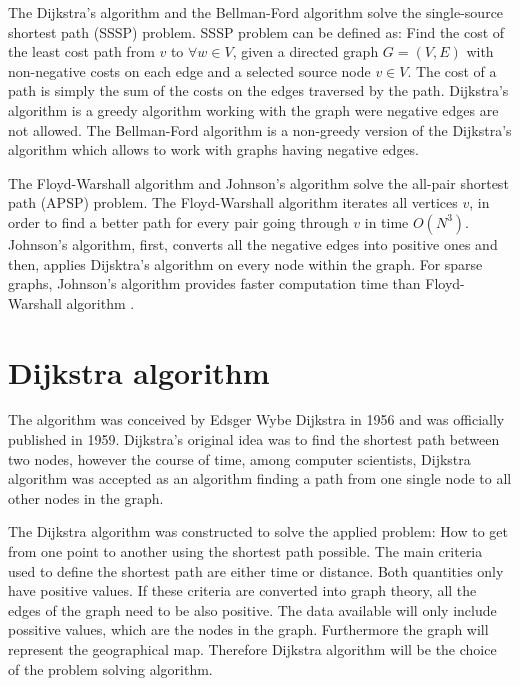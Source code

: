\documentclass[thesis=M,english]{FITthesis}[2012/10/20]
\begin{document}
The Dijkstra's algorithm \cite{Dijkstra59} and the Bellman-Ford algorithm \cite{Bellman58, FordFulkerson62} solve the single-source shortest path (SSSP) problem. SSSP problem can be defined as: Find the cost of the least cost path from $v$ to $\forall w \in V$, given a directed graph $G = (V,E)$ with non-negative costs on each edge and a selected source node $v \in V$. The cost of a path is simply the sum of the costs on the edges traversed by the path. Dijkstra's algorithm is a greedy algorithm working with the graph were negative edges are not allowed. The Bellman-Ford algorithm is a non-greedy version of the Dijkstra's algorithm which allows to work with graphs having negative edges.

The Floyd-Warshall algorithm \cite{Warshall62, Floyd56} and Johnson's algorithm \cite{Johnson77} solve the all-pair shortest path (APSP) problem. The Floyd-Warshall algorithm iterates all vertices $v$, in order to find a better path for every pair going through $v$ in time $O(N^3)$. Johnson's algorithm, first, converts all the negative edges into positive ones and then, applies Dijsktra's algorithm on every node within the graph. 
For sparse graphs, Johnson's algorithm provides faster computation time than Floyd-Warshall algorithm \cite{Cormen01}.


\section{Dijkstra algorithm}
\label{sec:dijsktra}
The algorithm was conceived by Edsger Wybe Dijkstra in 1956 and was officially published in 1959. Dijkstra's original idea was to find the shortest path between two nodes, however the course of time, among computer scientists, Dijkstra algorithm was accepted as an algorithm finding a path from one single node to all other nodes in the graph. 


The Dijkstra algorithm was constructed to solve the applied problem: How to get from one point to another using the shortest path possible. %
The main criteria used to define the shortest path are either time or distance. Both quantities only have positive values. If these criteria are converted into graph theory, all the edges of the graph need to be also positive.
The data available will only include possitive values, which are the nodes in the graph. Furthermore the graph will represent the geographical map. Therefore Dijkstra algorithm will be the choice of the problem solving algorithm. 
\end{document}
